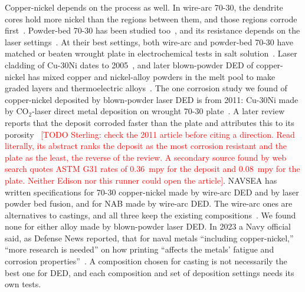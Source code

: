 \documentclass[12pt,letterpaper]{article}
\newcommand{\todo}[1]{\textcolor{red}{[TODO Sterling: #1]}}
\begin{document}
Copper-nickel depends on the process as well. In wire-arc 70-30, the
dendrite cores hold more nickel than the regions between them, and those
regions corrode first~\cite{song2024}. Powder-bed 70-30 has been studied
too~\cite{liu2024}, and its resistance depends on the laser
settings~\cite{nadimi2025}. At their best settings, both wire-arc and
powder-bed 70-30 have matched or beaten wrought plate in electrochemical
tests in salt solution~\cite{song2024,nadimi2025}.
Laser cladding of Cu-30Ni dates to 2005~\cite{adak2005}, and later
blown-powder DED of copper-nickel has mixed copper and nickel-alloy powders
in the melt pool to make graded layers and thermoelectric
alloys~\cite{karnati2019,yadav2020,williams2025}. The one corrosion study
we found of copper-nickel deposited by blown-powder laser DED is from 2011:
Cu-30Ni made by CO$_2$-laser direct metal deposition on wrought 70-30
plate~\cite{bhattacharya2011}. A later review reports that the deposit
corroded faster than the plate and attributes this to its
porosity~\cite{issc2012} \todo{check the 2011 article before citing a
direction. Read literally, its abstract ranks the deposit as the most
corrosion resistant and the plate as the least, the reverse of the review. A
secondary source found by web search quotes ASTM G31 rates of 0.36~mpy for
the deposit and 0.08~mpy for the plate. Neither Edison nor this runner could
open the article}. NAVSEA has written specifications for 70-30 copper-nickel made by
wire-arc DED and by laser powder bed fusion, and for NAB made by wire-arc DED.
The wire-arc ones are alternatives to castings, and all three keep the
existing compositions~\cite{milprf32816,milprf32804,milprf32815}. We found none for
either alloy made by blown-powder laser DED. In 2023 a Navy official said,
as Defense News reported, that for naval metals ``including copper-nickel,''
``more research is needed'' on how printing ``affects the metals' fatigue and
corrosion properties''~\cite{defensenews2023}. A composition chosen for casting is not
necessarily the best one for DED, and each composition and set of deposition
settings needs its own tests.
\end{document}
